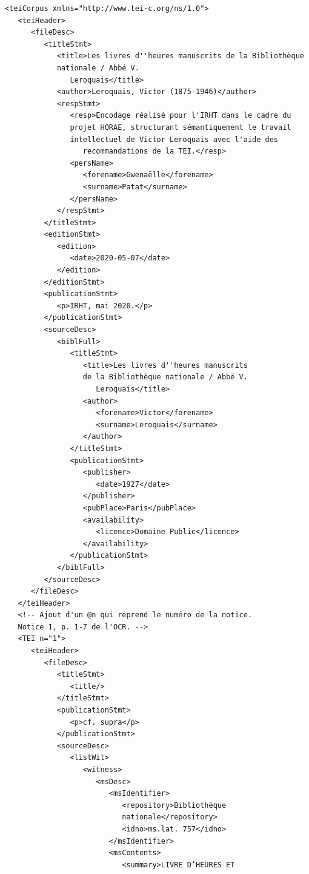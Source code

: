 \documentclass[a4paper,12pt,twoside]{book}
\begin{document}
\begin{verbatim}
<teiCorpus xmlns="http://www.tei-c.org/ns/1.0">
   <teiHeader>
      <fileDesc>
         <titleStmt>
            <title>Les livres d''heures manuscrits de la Bibliothèque
            nationale / Abbé V.
               Leroquais</title>
            <author>Leroquais, Victor (1875-1946)</author>
            <respStmt>
               <resp>Encodage réalisé pour l'IRHT dans le cadre du
               projet HORAE, structurant sémantiquement le travail 
               intellectuel de Victor Leroquais avec l'aide des
                  recommandations de la TEI.</resp>
               <persName>
                  <forename>Gwenaëlle</forename>
                  <surname>Patat</surname>
               </persName>
            </respStmt>
         </titleStmt>
         <editionStmt>
            <edition>
               <date>2020-05-07</date>
            </edition>
         </editionStmt>
         <publicationStmt>
            <p>IRHT, mai 2020.</p>
         </publicationStmt>
         <sourceDesc>
            <biblFull>
               <titleStmt>
                  <title>Les livres d''heures manuscrits 
                  de la Bibliothèque nationale / Abbé V.
                     Leroquais</title>
                  <author>
                     <forename>Victor</forename>
                     <surname>Leroquais</surname>
                  </author>
               </titleStmt>
               <publicationStmt>
                  <publisher>
                     <date>1927</date>
                  </publisher>
                  <pubPlace>Paris</pubPlace>
                  <availability>
                     <licence>Domaine Public</licence>
                  </availability>
               </publicationStmt>
            </biblFull>
         </sourceDesc>
      </fileDesc>
   </teiHeader>
   <!-- Ajout d'un @n qui reprend le numéro de la notice. 
   Notice 1, p. 1-7 de l'OCR. -->
   <TEI n="1">
      <teiHeader>
         <fileDesc>
            <titleStmt>
               <title/>
            </titleStmt>
            <publicationStmt>
               <p>cf. supra</p>
            </publicationStmt>
            <sourceDesc>
               <listWit>
                  <witness>
                     <msDesc>
                        <msIdentifier>
                           <repository>Bibliothèque 
                           nationale</repository>
                           <idno>ms.lat. 757</idno>
                        </msIdentifier>
                        <msContents>
                           <summary>LIVRE D’HEURES ET 

\end{verbatim}
\end{document}
